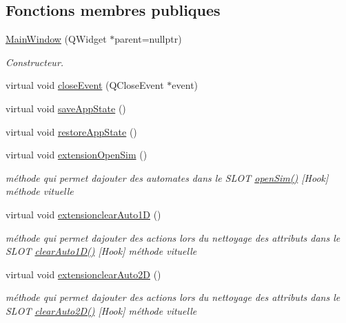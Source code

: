 \subsection*{Fonctions membres publiques}
\begin{DoxyCompactItemize}
\item 
\hyperlink{class_main_window_a996c5a2b6f77944776856f08ec30858d}{Main\+Window} (Q\+Widget $\ast$parent=nullptr)
\begin{DoxyCompactList}\small\item\em Constructeur. \end{DoxyCompactList}\item 
virtual void \hyperlink{class_main_window_a4e20a4a065fbb0e4d3532a45a0a91425}{close\+Event} (Q\+Close\+Event $\ast$event)
\item 
virtual void \hyperlink{class_main_window_a94b693e3fa35f35ba200d2427b9cd419}{save\+App\+State} ()
\item 
virtual void \hyperlink{class_main_window_ab1dbe77cfb9a4876733a540614afdec0}{restore\+App\+State} ()
\item 
virtual void \hyperlink{class_main_window_aec09ccd11397e7c8f83852ede698cf9c}{extension\+Open\+Sim} ()
\begin{DoxyCompactList}\small\item\em méthode qui permet d\textquotesingle{}ajouter des automates dans le S\+L\+OT \hyperlink{class_main_window_a13e1e518cda3c3ef508f319e5230a425}{open\+Sim()} \mbox{[}Hook\mbox{]} méthode vituelle \end{DoxyCompactList}\item 
virtual void \hyperlink{class_main_window_a51581d05a87d52c310c5232b4d05a2ea}{extensionclear\+Auto1D} ()
\begin{DoxyCompactList}\small\item\em méthode qui permet d\textquotesingle{}ajouter des actions lors du nettoyage des attributs dans le S\+L\+OT \hyperlink{class_main_window_a97b2dcddfafe0559b8b0e631f2bcf375}{clear\+Auto1\+D()} \mbox{[}Hook\mbox{]} méthode vituelle \end{DoxyCompactList}\item 
virtual void \hyperlink{class_main_window_a44411b6c7380592b08589b6edde6b5dc}{extensionclear\+Auto2D} ()
\begin{DoxyCompactList}\small\item\em méthode qui permet d\textquotesingle{}ajouter des actions lors du nettoyage des attributs dans le S\+L\+OT \hyperlink{class_main_window_a37e61e72d181b0a43900167b582caeb4}{clear\+Auto2\+D()} \mbox{[}Hook\mbox{]} méthode vituelle \end{DoxyCompactList}\end{DoxyCompactItemize}
